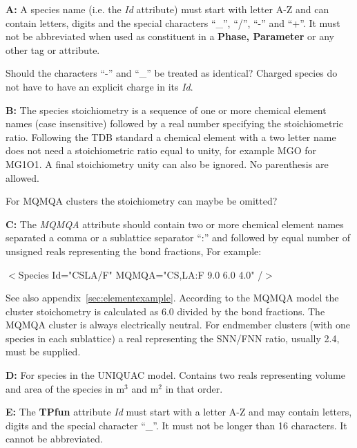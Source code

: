 \documentclass{article}
\begin{document}
\begin{description}
\item{\bf A:}\label{sec:noteA} A species name (i.e. the {\em Id}
  attribute) must start with letter A-Z and can contain letters,
  digits and the special characters ``\_'', ``/'', ``-'' and ``+''.
  It must not be abbreviated when used as constituent in a {\bf Phase,
    Parameter} or any other tag or attribute.

  Should the characters ``-'' and ``\_'' be treated as identical?
  Charged species do not have to have an explicit charge in its {\em
    Id}.

\item{\bf B:} The species stoichiometry is a sequence of one or more
  chemical element names (case insensitive) followed by a real number
  specifying the stoichiometric ratio.  Following the TDB standard a
  chemical element with a two letter name does not need a stoichiometric ratio
  equal to unity, for example MGO for MG1O1.  A final stoichiometry
  unity can also be ignored.  No parenthesis are allowed.

  For MQMQA clusters the stoichiometry can maybe be omitted?

\item{\bf C:} The {\em MQMQA} attribute should contain two or more
  chemical element names separated a comma or a sublattice separator
  ``:'' and followed by equal number of unsigned reals representing
  the bond fractions, For example:

  $<$Species Id="CSLA/F"  MQMQA="CS,LA:F  9.0 6.0 4.0" /$>$

  See also appendix~\ref{sec:elementexample}.  According to the MQMQA
  model the cluster stoichometry is calculated as 6.0 divided by the
  bond fractions.  The MQMQA cluster is always electrically neutral.
  For endmember clusters (with one species in each sublattice) a real
  representing the SNN/FNN ratio, usually 2.4, must be supplied.

\item{\bf D:} For species in the UNIQUAC model.  Contains two reals
  representing volume and area of the species in m$^3$ and m$^2$ in
  that order.

\item{\bf E:} The {\bf TPfun} attribute {\em Id} must start with a letter
  A-Z and may contain letters, digits and the special character
  ``\_''.  It must not be longer than 16 characters.  It cannot be
  abbreviated.


\end{description}
\end{document}
